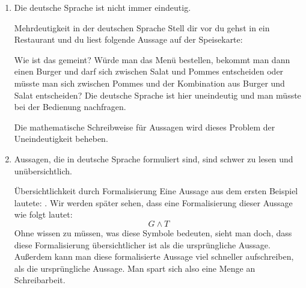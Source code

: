 \documentclass[../../main.tex]{subfiles}
\begin{document}
\begin{enumerate}
    \item Die deutsche Sprache ist nicht immer eindeutig. 
        \begin{example}{Mehrdeutigkeit in der deutschen Sprache}
        Stell dir vor du gehst in ein Restaurant und du liest folgende Aussage auf der
        Speisekarte: 
        
         
         Wie ist das gemeint? Würde man das Menü bestellen, bekommt man dann einen Burger und darf sich zwischen Salat und Pommes entscheiden oder müsste man sich zwischen Pommes und der Kombination aus Burger und Salat entscheiden? Die deutsche Sprache ist hier uneindeutig und man müsste bei der Bedienung nachfragen.
         
        \end{example}
        Die mathematische Schreibweise für Aussagen wird dieses Problem der Uneindeutigkeit beheben.
    \item Aussagen, die in deutsche Sprache formuliert sind, sind schwer zu lesen und unübersichtlich.
    \begin{example}{Übersichtlichkeit durch Formalisierung}
        Eine Aussage aus dem ersten Beispiel lautete: . Wir werden später sehen, dass eine Formalisierung dieser Aussage wie folgt lautet:
        \[ G \land T\]
        Ohne wissen zu müssen, was diese Symbole bedeuten, sieht man doch, dass diese Formalisierung übersichtlicher ist als die ursprüngliche Aussage. Außerdem kann man diese formalisierte Aussage viel schneller aufschreiben, als die ursprüngliche Aussage. Man spart sich also eine Menge an Schreibarbeit.
    \end{example}
\end{enumerate}
\end{document}
